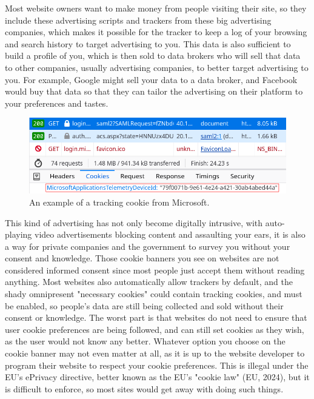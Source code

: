 \documentclass[11pt]{article}
\makeatletter
\newcommand{\citeprocitem}[2]{\hyper@linkstart{cite}{citeproc_bib_item_#1}#2\hyper@linkend}
\makeatother
\begin{document}
Most website owners want to make money from people visiting their site,
so they include these advertising scripts and trackers from these big
advertising companies, which makes it possible for the tracker to keep
a log of your browsing and search history to target advertising to you.
This data is also sufficient to build a profile of
you, which is then sold to data brokers who will sell that data
to other companies, usually advertising companies, to better
target advertising to you. For example, Google might sell your data
to a data broker, and Facebook would buy that data so that they can
tailor the advertising on their platform to
your preferences and tastes.  \\

\begin{figure}[htbp]
\centering
\includegraphics[width=.9\linewidth]{./images/tracking-cookie.png}
\caption{An example of a tracking cookie from Microsoft.}
\end{figure}

 \newpage

This kind of advertising has not only become digitally intrusive,
with auto-playing video advertisements blocking content
and assaulting your ears, it is also a way for
private companies and the government to survey you without your consent
and knowledge. Those cookie banners you see on websites are
not considered informed consent since most people
just accept them without reading anything.
Most websites also automatically allow trackers by default,
and the shady omnipresent "necessary cookies"
could contain tracking cookies, and must be enabled,
so people's data are still being collected and sold without their
consent or knowledge. The worst part is that websites
do not need to ensure that user cookie preferences are being followed,
and can still set cookies as they wish, as the user would not know any
better. Whatever option you choose on the cookie banner may not even
matter at all, as it is up to the website developer to program
their website to respect your cookie preferences. This is illegal
under the EU's ePrivacy directive, better known as the
EU's "cookie law" (\citeprocitem{2}{EU, 2024}), but it is difficult to enforce,
so most sites would get away with doing such things.
\end{document}
